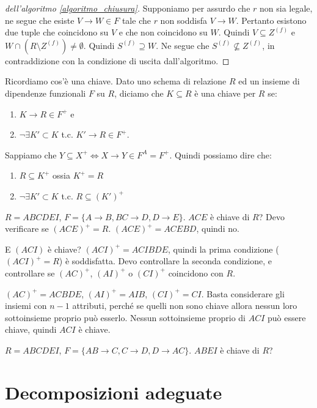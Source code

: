\begin{proof}[dell'algoritmo \ref{algoritmo_chiusura}]
Supponiamo per assurdo che $r$ non sia legale, ne segue che esiste $V \to W \in F$ tale che $r$ non soddisfa $V \to W$. Pertanto esistono due tuple che coincidono su $V$ e che non coincidono su $W$. Quindi $V \subseteq Z^{(f)}$ e $W \cap (R \setminus Z^{(f)}) \neq \emptyset$. Quindi $S^{(f)} \supseteq W$. Ne segue che $S^{(f)} \not\subseteq Z^{(f)}$, in contraddizione con la condizione di uscita dall'algoritmo.
\end{proof}

Ricordiamo cos'\`e una chiave. Dato uno schema di relazione $R$ ed un insieme di dipendenze funzionali $F$ su $R$, diciamo che $K \subseteq R$ \`e una chiave per $R$ se:
\begin{enumerate}
    \item $K \to R \in F^+$ e
    \item $\neg \exists K' \subset K$ t.c. $K' \to R \in F^+$.
\end{enumerate}
Sappiamo che $Y \subseteq X^+ \iff X \to Y \in F^A = F^+$. Quindi possiamo dire che:
\begin{enumerate}
    \item $R \subseteq K^+$ ossia $K^+ = R$
    \item $\neg \exists K' \subset K $ t.c. $R \subseteq (K')^+$
\end{enumerate}

\begin{esercizio}
$R = ABCDEI$, $F = \{ A \to B, BC \to D, D \to E \}$. $ACE$ \`e chiave di $R$? Devo verificare se $(ACE)^+ = R$. $(ACE)^+ = ACEBD$, quindi no.

E $(ACI)$ \`e chiave? $(ACI)^+ = ACIBDE$, quindi la prima condizione ($(ACI)^+ = R$) \`e soddisfatta. Devo controllare la seconda condizione, e controllare se $(AC)^+$, $(AI)^+$ o $(CI)^+$ coincidono con $R$.

$(AC)^+ = ACBDE$, $(AI)^+ = AIB$, $(CI)^+ = CI$. Basta considerare gli insiemi con $n-1$ attributi, perché se quelli non sono chiave allora nessun loro sottoinsieme proprio pu\`o esserlo. Nessun sottoinsieme proprio di $ACI$ pu\`o essere chiave, quindi $ACI$ \`e chiave.
\end{esercizio}

\begin{esercizio}
$R = ABCDEI$, $F = \{ AB \to C, C \to D, D \to AC \}$. $ABEI$ \`e chiave di $R$?
\end{esercizio}

\section{Decomposizioni adeguate}

